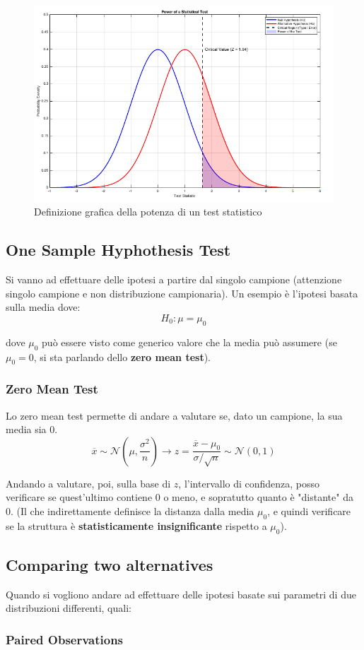 \begin{figure}[h]
\centering
\includegraphics[width=.7\textwidth]{img/chapter-4/power-value.png}
\caption{Definizione grafica della potenza di un test statistico}\label{img:power-value}
\end{figure}

\subsection{One Sample Hyphothesis Test}
Si vanno ad effettuare delle ipotesi a partire dal singolo campione (attenzione singolo campione e non distribuzione campionaria). Un esempio è l'ipotesi basata sulla media dove:
\[
H_0: \mu = \mu_0
\]

dove \(\mu_0\) può essere visto come generico valore che la media può assumere (se \(\mu_0 = 0\), si sta parlando dello \textbf{zero mean test}).

\subsubsection{Zero Mean Test}
Lo zero mean test permette di andare a valutare se, dato un campione, la sua media sia 0. 
\[
\overline{x} \sim \mathcal{N}(\mu, \frac{\sigma^2}{n}) \to z = \frac{\overline{x} - \mu_0}{\sigma/\sqrt{n}} \sim \mathcal{N}(0,1)
\]

Andando a valutare, poi, sulla base di \(z\), l'intervallo di confidenza, posso verificare se quest'ultimo contiene 0 o meno, e sopratutto quanto è "distante" da 0. (Il che indirettamente definisce la distanza dalla media \(\mu_0\), e quindi verificare se la struttura è \textbf{statisticamente insignificante} rispetto a \(\mu_0\)).

\subsection{Comparing two alternatives}
Quando si vogliono andare ad effettuare delle ipotesi basate sui parametri di due distribuzioni differenti, quali:
\subsubsection{Paired Observations}

